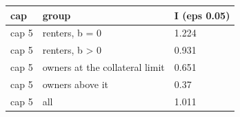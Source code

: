 \begingroup\small
\setlength{\tabcolsep}{3pt}
\renewcommand{\arraystretch}{1.04}
\begin{tabularx}{\linewidth}{XXX}
\toprule
cap & group & I (eps 0.05) \\
\midrule
cap 5 & renters, b = 0 & 1.224 \\
cap 5 & renters, b \textgreater{} 0 & 0.931 \\
cap 5 & owners at the collateral limit & 0.651 \\
cap 5 & owners above it & 0.37 \\
cap 5 & all & 1.011 \\
\bottomrule
\end{tabularx}
\endgroup
